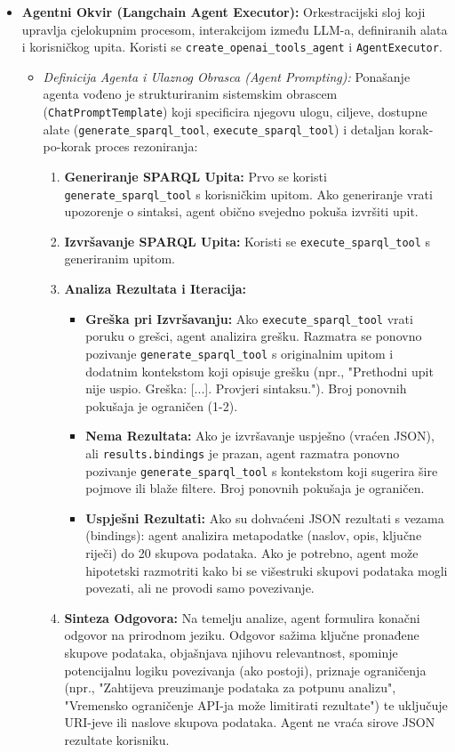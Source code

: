 \begin{itemize}
    \item \textbf{Agentni Okvir (Langchain Agent Executor):} Orkestracijski sloj koji upravlja cjelokupnim procesom, interakcijom između LLM-a, definiranih alata i korisničkog upita. Koristi se \texttt{create\_openai\_tools\_agent} i \texttt{AgentExecutor}.
    \begin{itemize}
        \item \textit{Definicija Agenta i Ulaznog Obrasca (Agent Prompting):} Ponašanje agenta vođeno je strukturiranim sistemskim obrascem (\texttt{ChatPromptTemplate}) koji specificira njegovu ulogu, ciljeve, dostupne alate (\texttt{generate\_sparql\_tool}, \texttt{execute\_sparql\_tool}) i detaljan korak-po-korak proces rezoniranja:
        \begin{enumerate}
            \item \textbf{Generiranje SPARQL Upita:} Prvo se koristi \texttt{generate\_sparql\_tool} s korisničkim upitom. Ako generiranje vrati upozorenje o sintaksi, agent obično svejedno pokuša izvršiti upit.
            \item \textbf{Izvršavanje SPARQL Upita:} Koristi se \texttt{execute\_sparql\_tool} s generiranim upitom.
            \item \textbf{Analiza Rezultata i Iteracija:}
                \begin{itemize}
                    \item \textbf{Greška pri Izvršavanju:} Ako \texttt{execute\_sparql\_tool} vrati poruku o grešci, agent analizira grešku. Razmatra se ponovno pozivanje \texttt{generate\_sparql\_tool} s originalnim upitom i dodatnim kontekstom koji opisuje grešku (npr., "Prethodni upit nije uspio. Greška: [...]. Provjeri sintaksu."). Broj ponovnih pokušaja je ograničen (1-2).
                    \item \textbf{Nema Rezultata:} Ako je izvršavanje uspješno (vraćen JSON), ali \texttt{results.bindings} je prazan, agent razmatra ponovno pozivanje \texttt{generate\_sparql\_tool} s kontekstom koji sugerira šire pojmove ili blaže filtere. Broj ponovnih pokušaja je ograničen.
                    \item \textbf{Uspješni Rezultati:} Ako su dohvaćeni JSON rezultati s vezama (bindings): agent analizira metapodatke (naslov, opis, ključne riječi) do 20 skupova podataka. Ako je potrebno, agent može hipotetski razmotriti kako bi se višestruki skupovi podataka mogli povezati, ali ne provodi samo povezivanje.
                \end{itemize}
            \item \textbf{Sinteza Odgovora:} Na temelju analize, agent formulira konačni odgovor na prirodnom jeziku. Odgovor sažima ključne pronađene skupove podataka, objašnjava njihovu relevantnost, spominje potencijalnu logiku povezivanja (ako postoji), priznaje ograničenja (npr., "Zahtijeva preuzimanje podataka za potpunu analizu", "Vremensko ograničenje API-ja može limitirati rezultate") te uključuje URI-jeve ili naslove skupova podataka. Agent ne vraća sirove JSON rezultate korisniku.

\end{enumerate}
\end{itemize}
\end{itemize}
